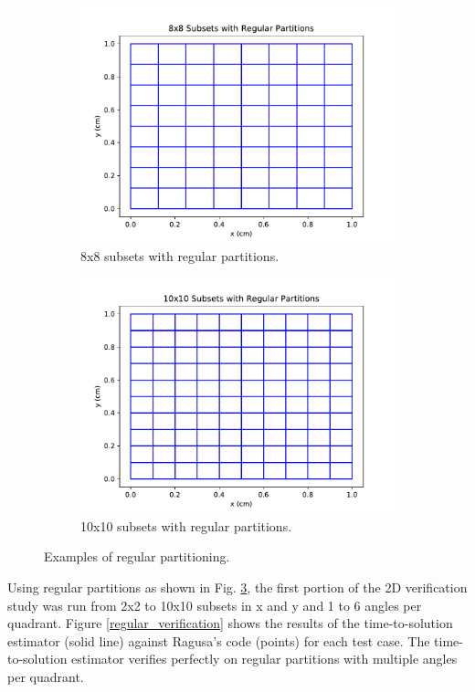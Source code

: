 \begin{figure}[H]
\begin{subfigure}[b]{0.45\textwidth}
  \includegraphics[width=\textwidth]{../cut_line_files/8_regular.pdf}
  \caption{8x8 subsets with regular partitions.}
  \label{8regular}
\end{subfigure}
\begin{subfigure}[b]{0.45\textwidth}
  \includegraphics[width=\textwidth]{../cut_line_files/10_regular.pdf}
  \caption{10x10 subsets with regular partitions.}
  \label{10regular}
\end{subfigure}
\caption{Examples of regular partitioning.}
\label{regular_partitions}
\end{figure}

Using regular partitions as shown in Fig. \ref{regular_partitions}, the first portion of the 2D verification study was run from 2x2 to 10x10 subsets in x and y and 1 to 6 angles per quadrant.  Figure \ref{regular_verification} shows the results of the time-to-solution estimator (solid line) against Ragusa's code (points) for each test case. The time-to-solution estimator verifies perfectly on regular partitions with multiple angles per quadrant. 

